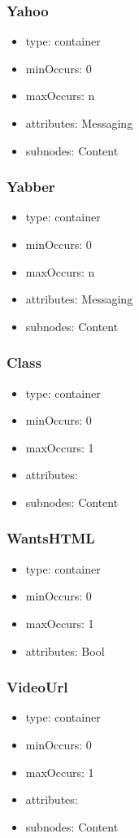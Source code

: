 \documentclass[a4paper,11pt]{article}
\begin{document}
\subsubsection{Yahoo}
\begin{itemize}
  \item type: container
  \item minOccurs: 0
  \item maxOccurs: n
  \item attributes: Messaging
  \item subnodes:
  \subitem Content
\end{itemize}

\subsubsection{Yabber}
\begin{itemize}
  \item type: container
  \item minOccurs: 0
  \item maxOccurs: n
  \item attributes: Messaging
  \item subnodes:
  \subitem Content
\end{itemize}

\subsubsection{Class}
\begin{itemize}
  \item type: container
  \item minOccurs: 0
  \item maxOccurs: 1
  \item attributes:
  \item subnodes:
  \subitem Content
\end{itemize}

\subsubsection{WantsHTML}
\begin{itemize}
  \item type: container
  \item minOccurs: 0
  \item maxOccurs: 1
  \item attributes: Bool 
\end{itemize}

\subsubsection{VideoUrl}
\begin{itemize}
  \item type: container
  \item minOccurs: 0
  \item maxOccurs: 1
  \item attributes:
  \item subnodes:
  \subitem Content
\end{itemize}
\end{document}
